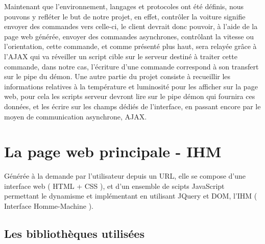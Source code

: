 Maintenant que l’environnement, langages et protocoles ont été définis, nous pouvons y refléter le but de notre projet, en effet, contrôler la voiture signifie envoyer des commandes vers celle-ci, le client devrait donc pouvoir, à l’aide de la page web générée, envoyer des commandes asynchrones, contrôlant la vitesse ou l’orientation, cette commande, et comme présenté plus haut, sera relayée grâce à l’AJAX qui va réveiller un script cible sur le serveur destiné à traiter cette commande, dans notre cas, l’écriture d’une commande correspond à son transfert sur le pipe du démon. Une autre partie du projet consiste à recueillir les informations relatives à la température et luminosité pour les afficher sur la page web, pour cela les scripts serveur devront lire sur le pipe démon qui fournira ces données, et les écrire sur les champs dédiés de l’interface, en passant encore par le moyen de communication asynchrone, AJAX.

\section{La page web principale - IHM}

Générée à la demande par l’utilisateur depuis un URL, elle se compose d’une interface web ( HTML + CSS ), et d’un ensemble de scipts JavaScript permettant le dynamisme et implémentant en utilisant JQuery et DOM, l’IHM ( Interface Homme-Machine ).

\subsection{Les bibliothèques utilisées}

